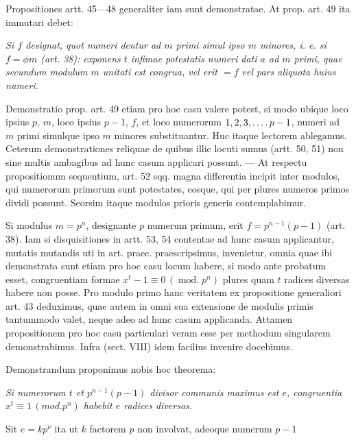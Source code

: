Propositiones artt. 45---48 generaliter iam sunt demonstratae. At prop. art. 49 ita immutari debet:

\emph{Si $f$ designat, quot numeri dentur ad $m$ primi simul ipso $m$ minores, i. e. si $f=\phi m$ (art. 38): exponens $t$ infimae potestatis numeri dati $a$ ad $m$ primi, quae secundum modulum $m$ unitati est congrua, vel erit $=f$ vel pars aliquota huius numeri.}

Demonstratio prop. art. 49 etiam pro hoc casu valere potest, si modo ubique loco ipsius $p$, $m$, loco ipsius $p-1$, $f$, et loco numerorum $1,2,3,\mathinner{\ldotp\ldotp\ldotp\ldotp} p-1$, numeri ad $m$ primi simulque ipso $m$ minores substituantur. Huc itaque lectorem ablegamus. Ceterum demonstrationes reliquae de quibus illic locuti sumus (artt. 50, 51) non sine multis ambagibus ad hunc casum applicari possunt. --- At respectu propositionum sequentium, art. 52 sqq. magna differentia incipit inter modulos, qui numerorum primorum sunt potestates, eosque, qui per plures numeros primos dividi possunt. Seorsim itaque modulos prioris generis contemplabimur.

Si modulus $m=p^n$, designante $p$ numerum primum, erit $f=p^{n-1}(p-1)$ (art. 38). Iam si disquisitiones in artt. 53, 54 contentae ad hunc casum applicantur, mutatis mutandis uti in art. praec. praescripsimus, invenietur, omnia quae ibi demonstrata sunt etiam pro hoc casu locum habere, si modo ante probatum esset, congruentiam formae $x^t-1\equiv0\,(\operatorname{mod.}p^n)$ plures quam $t$ radices diversas habere non posse. Pro modulo primo hanc veritatem ex propositione generaliori art. 43 deduximus, quae autem in omni sua extensione de modulis primis tantummodo valet, neque adeo ad hunc casum applicanda. Attamen propositionem pro hoc casu particulari veram esse per methodum singularem demonstrabimus. Infra (sect. VIII) idem facilius invenire docebimus.

Demonstrandum proponimus nobis hoc theorema:

\emph{Si numerorum $t$ et $p^{n-1}(p-1)$ divisor communis maximus est $e$, congruentia $x^t\equiv1\,(\mathit{mod.}p^n)$ habebit $e$ radices diversas.}

Sit $e=kp^{\nu}$ ita ut $k$ factorem $p$ non involvat, adeoque numerum $p-1$
